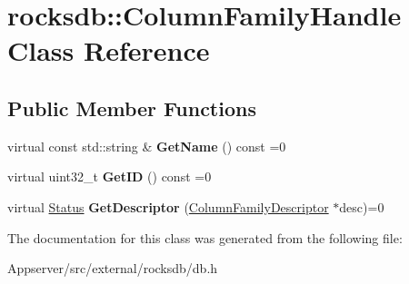 \hypertarget{classrocksdb_1_1ColumnFamilyHandle}{}\section{rocksdb\+:\+:Column\+Family\+Handle Class Reference}
\label{classrocksdb_1_1ColumnFamilyHandle}
\subsection*{Public Member Functions}
\begin{DoxyCompactItemize}
\item 
virtual const std\+::string \& {\bfseries Get\+Name} () const =0\hypertarget{classrocksdb_1_1ColumnFamilyHandle_a04833c62843c4331696bc014f864af07}{}\label{classrocksdb_1_1ColumnFamilyHandle_a04833c62843c4331696bc014f864af07}

\item 
virtual uint32\+\_\+t {\bfseries Get\+ID} () const =0\hypertarget{classrocksdb_1_1ColumnFamilyHandle_ab217bae1edd55c8129e99ed9ce6dc922}{}\label{classrocksdb_1_1ColumnFamilyHandle_ab217bae1edd55c8129e99ed9ce6dc922}

\item 
virtual \hyperlink{classrocksdb_1_1Status}{Status} {\bfseries Get\+Descriptor} (\hyperlink{structrocksdb_1_1ColumnFamilyDescriptor}{Column\+Family\+Descriptor} $\ast$desc)=0\hypertarget{classrocksdb_1_1ColumnFamilyHandle_abd4ece7c51d22ce0b1afa62708c36fa8}{}\label{classrocksdb_1_1ColumnFamilyHandle_abd4ece7c51d22ce0b1afa62708c36fa8}

\end{DoxyCompactItemize}


The documentation for this class was generated from the following file\+:\begin{DoxyCompactItemize}
\item 
Appserver/src/external/rocksdb/db.\+h\end{DoxyCompactItemize}
